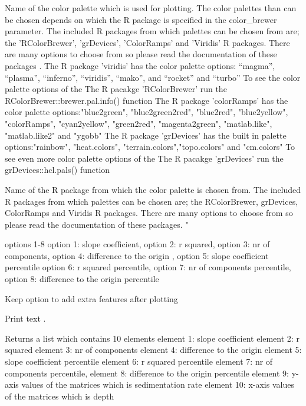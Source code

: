 \documentclass[a4paper]{book}
\begin{document}
\begin{Arguments}
\begin{ldescription}
\item[\code{palette\_name}] Name of the color palette which is used for plotting.
The color palettes than can be chosen depends on which the R package is specified in
the color\_brewer parameter. The included R packages from which palettes can be chosen
from are; the 'RColorBrewer', 'grDevices', 'ColorRamps' and 'Viridis' R packages.
There are many options to choose from so please
read the documentation of these packages .
The R package 'viridis' has the color palette options: “magma”, “plasma”,
“inferno”, “viridis”, “mako”, and “rocket”  and “turbo”
To see the color palette options of the The R pacakge 'RColorBrewer' run
the RColorBrewer::brewer.pal.info() function
The R package 'colorRamps' has the color palette options:"blue2green",
"blue2green2red", "blue2red",    "blue2yellow", "colorRamps",    "cyan2yellow",
"green2red", "magenta2green", "matlab.like", "matlab.like2" and    "ygobb"
The R package 'grDevices' has the built in  palette options:"rainbow",
"heat.colors", "terrain.colors","topo.colors" and "cm.colors"
To see even more color palette options of the The R pacakge 'grDevices' run
the grDevices::hcl.pals() function

\item[\code{color\_brewer}] Name of the R package from which the color palette is chosen from.
The included R packages from which palettes can be chosen
are; the RColorBrewer, grDevices, ColorRamps and Viridis R packages.
There are many options to choose from so please
read the documentation of these packages. "

\item[\code{plot\_res}] options 1-8 option 1: slope coefficient, option 2: r squared,
option 3: nr of components, option 4: difference to the  origin , option 5: slope coefficient percentile
option 6: r squared percentile, option 7: nr of components percentile,
option 8: difference to the origin percentile 

\item[\code{keep\_editable}] Keep option to add extra features after plotting  

\item[\code{verbose}] Print text .
\end{ldescription}
\end{Arguments}
%
\begin{Value}
Returns a list which contains 10 elements
element 1: slope coefficient
element 2: r squared
element 3: nr of components
element 4: difference to the origin
element 5: slope coefficient percentile
element 6: r squared percentile
element 7: nr of components percentile,
element 8: difference to the origin percentile
element 9: y-axis values of the matrices which is sedimentation rate
element 10: x-axis values of the matrices which is depth
\end{Value}
\end{document}
